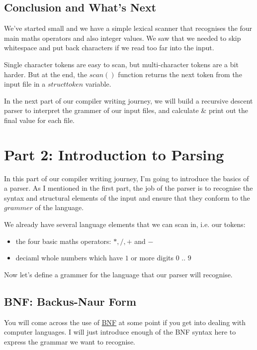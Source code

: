 \documentclass[a4paper,12pt]{article}
\begin{document}
\subsection{Conclusion and What's Next}

We've started small and we have a simple lexical scanner that recognises the four main maths operators and also integer values. We saw that we needed to skip whitespace and put back characters if we read too far into the input.

Single character tokens are easy to scan, but multi-character tokens are a bit harder. But at the end, the $scan()$ function returns the next token from the input file in a $struct token$ variable.

In the next part of our compiler writing journey, we will build a recursive descent parser to interpret the grammer of our input files, and calculate \& print out the final value for each file.

\section{Part 2: Introduction to Parsing}

In this part of our compiler writing journey, I'm going to introduce the basics of a parser. As I mentioned in the first part, the job of the parser is to recognise the syntax and structural elements of the input and ensure that they conform to the $grammer$ of the language.

We already have several language elements that we can scan in, i.e. our tokens:

\begin{itemize}
    \item the four basic maths operators: $*, /, +$ and $-$
    \item deciaml whole numbers which have $1$ or more digits $0$ .. $9$
\end{itemize}

Now let's define a grammer for the language that our parser will recognise.

\subsection{BNF: Backus-Naur Form}

You will come across the use of \href{https://en.wikipedia.org/wiki/Backus%E2%80%93Naur_form}{BNF} at some point if you get into dealing with computer languages. I will just introduce enough of the BNF syntax here to express the grammar we want to recognise.
\end{document}
